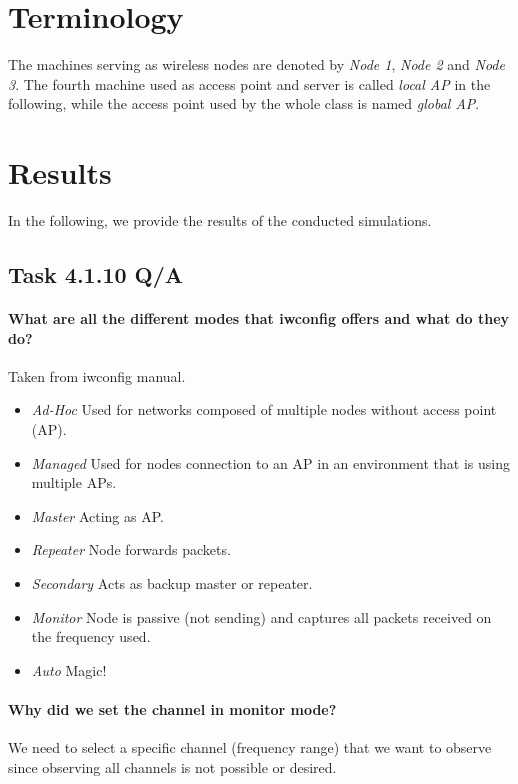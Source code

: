 \documentclass[12pt,a4paper]{article}
\begin{document}
\section{Terminology}
The machines serving as wireless nodes are denoted by \emph{Node 1}, \emph{Node 2} and \emph{Node 3}.
The fourth machine used as access point and server is called \emph{local AP} in the following, while the access point used by the whole class is named \emph{global AP}.

\section{Results}
In the following, we provide the results of the conducted simulations.
\subsection{Task 4.1.10 Q/A}

\paragraph{What are all the different modes that iwconfig offers and what do they do?}
Taken from iwconfig manual\cite{iwconfig:man}.
\begin{itemize}
	\item \emph{Ad-Hoc}
		Used for networks composed of multiple nodes without access point (AP).
	\item \emph{Managed}
		Used for nodes connection to an AP in an environment that is using multiple APs.
	\item \emph{Master}
		Acting as AP.
	\item \emph{Repeater}
		Node forwards packets.
	\item \emph{Secondary}
		Acts as backup master or repeater.
	\item \emph{Monitor}
		Node is passive (not sending) and captures all packets received on the frequency used.
	\item \emph{Auto}
		Magic!
\end{itemize}


\paragraph{Why did we set the channel in monitor mode?}
We need to select a specific channel (frequency range) that we want to observe since observing all channels is not possible or desired.
\end{document}
